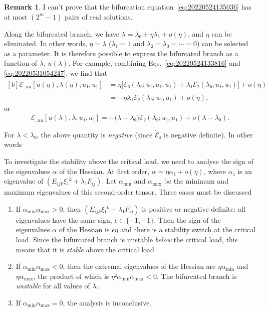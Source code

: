 \documentclass[12pt, final]{scrartcl}
\theoremstyle{definition}
\newtheorem{remark}{Remark}
\begin{document}
\begin{remark}
  I can't prove that the bifurcation equation~\eqref{eq:20220524135036} has at
  most \((2^m - 1)\) pairs of real solutions.
\end{remark}

Along the bifurcated branch, we have \(λ = λ₀ + η λ₁ + o(η)\), and \(η\) can be
eliminated. In other words, \(η=λ\) (\(λ₁=1\) and \(λ₂ = λ₃ = \cdots = 0\)) can
be selected as a parameter. It is therefore possible to express the bifurcated
branch as a function of \(λ\), \(u(λ)\). For example, combining
Eqs.~\eqref{eq:20220524133816} and \eqref{eq:20220531054247}, we find that
\begin{equation}
  \begin{aligned}[b]
    ℰ_{, uu}[u(η), λ(η); u₁, u₁]
    &= η \bigl[ℰ₃(λ₀ ; u₁, u₁, u₁)  + λ₁ \dot{ℰ}₂(λ₀; u₁, u₁)\bigr] + o(η)\\
    &= - η λ₁ \dot{ℰ}₂(λ₀; u₁, u₁) + o(η),
  \end{aligned}
\end{equation}
or
\begin{equation}
  \label{eq:20220819160235}
  ℰ_{, uu}[u(λ), λ; u₁, u₁] = -\bigl( λ - λ₀ \bigr) \dot{ℰ}₂(λ₀; u₁, u₁) + o(λ - λ₀).
\end{equation}

For \(λ < λ₀\), the above quantity is \emph{negative} (since \(\dot{ℰ}₂\) is
negative definite). In other words

\begin{center}
\end{center}

To investigate the stability above the critical load, we need to analyse the
sign of the eigenvalues \(α\) of the Hessian. At first order,
\(α = η α₁ + o(η)\), where \(α₁\) is an eigenvalue of
\((E_{ijk} ξ₁^k + λ₁ F_{ij})\). Let \(α_{\min}\) and \(α_{\max}\) be the minimum
and maximum eigenvalues of this second-order tensor. Three cases must be
discussed
\begin{enumerate}
\item If \(α_{\min} α_{\max} > 0\), then \((E_{ijk} ξ₁^k + λ₁ F_{ij})\) is
  positive or negative definite: all eigenvalues have the same sign,
  \(\epsilon ∈ \{-1, +1\}\). Then the sign of the eigenvalues \(α\) of the
  Hessian is \(\epsilon η\) and there is a stability switch at the critical
  load. Since the bifurcated branch is unstable \emph{below} the critical load,
  this means that it is \emph{stable} above the critical load.
\item If \(α_{\min} α_{\max} < 0\), then the extremal eigenvalues of the Hessian
  are \(η α_{\min}\) and \(η α_{\max}\), the product of which is
  \(η² α_{\min} α_{\max} < 0\). The bifurcated branch is \emph{unstable} for all
  values of \(λ\).
\item If \(α_{\min} α_{\max} = 0\), the analysis is inconclusive.
\end{enumerate}
\end{document}
